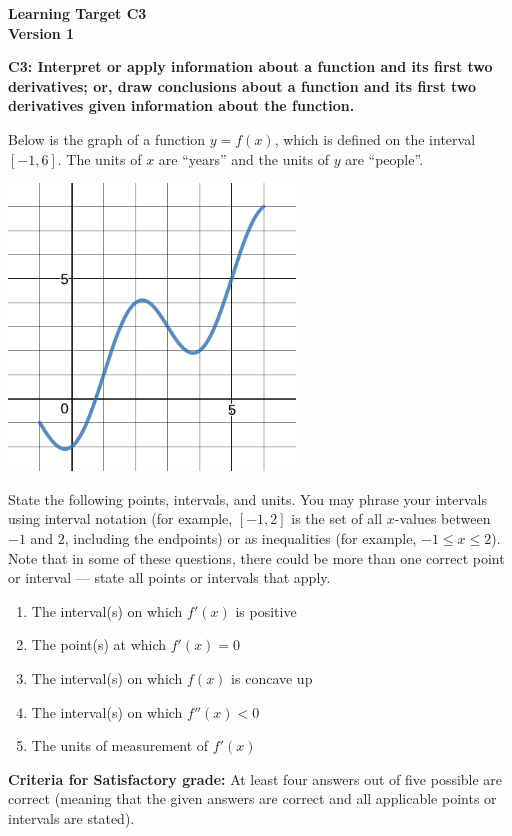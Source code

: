 \documentclass[10pt]{article}
\begin{document}
	\vspace*{0in}

		\begin{center}
			\textbf{Learning Target C3 \\
			Version 1} \\
		\end{center}


\begin{framed}
	\textbf{C3: Interpret or apply information about a function and its first two derivatives; or, draw conclusions about a function and its first two derivatives given information about the function. }
\end{framed}

Below is the graph of a function $y = f(x)$, which is defined on the interval $[-1,6]$. The units of $x$ are ``years'' and the units of $y$ are ``people''. 
\begin{center}
    \includegraphics[width=3in]{c3.png}
\end{center}
State the following points, intervals, and units. You may phrase your intervals using interval notation (for example, $[-1,2]$ is the set of all $x$-values between $-1$ and $2$, including the endpoints) or as inequalities (for example, $-1 \leq x \leq 2$). Note that in some of these questions, there could be more than one correct point or interval --- state all points or intervals that apply. 

\begin{enumerate}
    \item The interval(s) on which $f'(x)$ is positive 
    \item The point(s) at which $f'(x) = 0$ 
    \item The interval(s) on which $f(x)$ is concave up
    \item The interval(s) on which $f''(x) < 0$ 
    \item The units of measurement of $f'(x)$
\end{enumerate}


\vfill


\begin{small}
    \begin{framed}
        	\textbf{Criteria for Satisfactory grade:} At least four answers out of five possible are correct (meaning that the given answers are correct and all applicable points or intervals are stated). 
    \end{framed}

\end{small}
\end{document}
